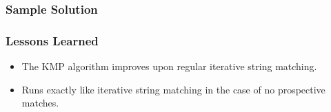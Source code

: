 \subsubsection{Sample Solution}


\subsubsection{Lessons Learned}
\begin{itemize}
	\item The KMP algorithm improves upon regular iterative string matching.
	\item Runs exactly like iterative string matching in the case of no prospective matches.
\end{itemize}

